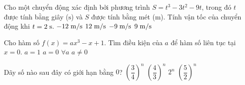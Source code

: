 \begin{ex}%
	Cho một chuyển động xác định bởi phương trình $S=t^3-3t^2-9t$, trong đó $t$ được tính bằng giây ($\mathrm{s}$) và $S$ được tính bằng mét ($\mathrm{m}$). Tính vận tốc của chuyển động khi $t=2\hspace{0.1cm} \mathrm{s}$.
	\choice
	{$-12\hspace{0.1cm} \mathrm{m/s}$}
	{$12 \hspace{0.1cm} \mathrm{m/s}$}
	{\True $-9 \hspace{0.1cm} \mathrm{m/s}$}
	{$9 \hspace{0.1cm} \mathrm{m/s}$}
\end{ex}
\begin{ex}%
	Cho hàm số $f(x)=ax^3-x+1$. Tìm điều kiện của $a$ để hàm số liên tục tại $x=0$.
	\choice
	{$a=1$}
	{$a=0$}
	{\True $\forall a$}
	{$a\ne 0$}
\end{ex}

\begin{ex}%
	Dãy số nào sau đây có giới hạn bằng $0$?
\choice
	{\True $\left(\dfrac{3}{4}\right)^n$}
	{$\left(\dfrac{4}{3}\right)^n$}
	{$2^n$}
	{$\left(\dfrac{5}{2}\right)^n$}
\end{ex}

